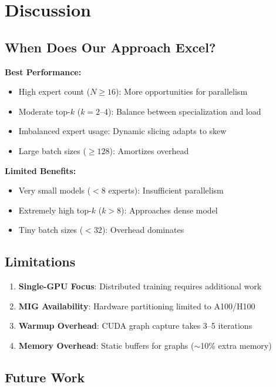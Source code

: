 \documentclass{article}
\begin{document}
\section{Discussion}

\subsection{When Does Our Approach Excel?}

\textbf{Best Performance:}
\begin{itemize}
    \item High expert count ($N \geq 16$): More opportunities for parallelism
    \item Moderate top-$k$ ($k = 2$--4): Balance between specialization and load
    \item Imbalanced expert usage: Dynamic slicing adapts to skew
    \item Large batch sizes ($\geq 128$): Amortizes overhead
\end{itemize}

\textbf{Limited Benefits:}
\begin{itemize}
    \item Very small models ($< 8$ experts): Insufficient parallelism
    \item Extremely high top-$k$ ($k > 8$): Approaches dense model
    \item Tiny batch sizes ($< 32$): Overhead dominates
\end{itemize}

\subsection{Limitations}

\begin{enumerate}
    \item \textbf{Single-GPU Focus}: Distributed training requires additional work
    \item \textbf{MIG Availability}: Hardware partitioning limited to A100/H100
    \item \textbf{Warmup Overhead}: CUDA graph capture takes 3--5 iterations
    \item \textbf{Memory Overhead}: Static buffers for graphs ($\sim$10\% extra memory)
\end{enumerate}

\subsection{Future Work}
\end{document}
